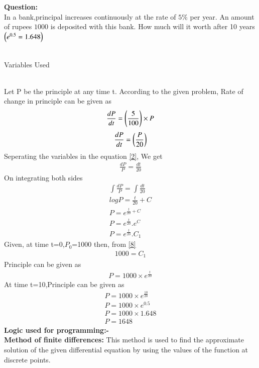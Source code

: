 \documentclass[journal]{IEEEtran}
\begin{document}
\textbf{Question:} \\
In a bank,principal increases continuously at the rate of $5\%$ per year. An amount of rupees $1000$ is deposited with this bank. How much will it worth after 10 years $\left(e^{0.5} = 1.648\right)$ \\ \\
\solution 
\begin{table}[h!]
    \centering
    
    \caption{Variables Used}
    
\end{table}
\\
\solution Let P be the principle at any time t. According to the given problem, Rate of change in principle can be given as 
\begin{align}
\frac{dP}{dt} = \left(\frac{5}{100}\right) \times P \label{1}
\end{align}
\begin{align}
\frac{dP}{dt} = \left(\frac{P}{20}\right) \label{2}
\end{align}
Seperating the variables in the equation \eqref{2}, We get 
\begin{align}
\frac{dP}{P}=\frac{dt}{20} \label{3}
\end{align}
On integrating both sides
\begin{align}
\int \frac{dP}{P}=\int \frac{dt}{20} \label{4} \\
log P = \frac{t}{20}+C \label{5} \\
P=e^{\frac{t}{20}+C} \label{6} \\
P=e^{\frac{t}{20}} . e^{C} \label{7} \\
P=e^{\frac{t}{20}} . C_1 \label{8}
\end{align}
Given, at time t=0,$P_0$=1000 then, from \eqref{8}
\begin{align}
1000=C_1 \label{9}
\end{align}
Principle can be given as 
\begin{align}
P = 1000 \times e^{\frac{t}{20}} \label{10}
\end{align}
At time t=10,Principle can be given as \\
\begin{align}
P =1000 \times e^{\frac{10}{20}} \\
P =1000 \times e^{0.5} \\
P = 1000 \times 1.648 \\
P = 1648
\end{align}
\textbf{Logic used for programming:-} \\
\textbf{Method of finite differences:} This method is used to find the approximate solution of the given differential equation by using the values of the function at discrete points.  \\
\end{document}
